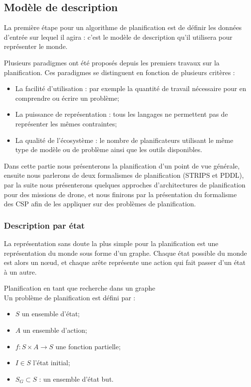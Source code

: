 \subsection{Modèle de description}

La première étape pour un algorithme de planification est de définir les données d'entrée sur lequel il agira : c'est le modèle de description qu'il utilisera pour représenter le monde.

Plusieurs paradigmes ont été proposés depuis les premiers travaux sur la planification. Ces paradigmes se distinguent en fonction de plusieurs critères :

\begin{itemize}
	\item La facilité d'utilisation : par exemple la quantité de travail nécessaire pour en comprendre ou écrire un problème;
	\item La puissance de représentation : tous les langages ne permettent pas de représenter les mêmes contraintes;
	\item La qualité de l'écosystème : le nombre de planificateurs utilisant le même type de modèle ou de problème ainsi que les outils disponibles.
\end{itemize}

Dans cette partie nous présenterons la planification d'un point de vue générale, ensuite nous parlerons de deux formalismes de planification (STRIPS et PDDL), par la suite nous présenterons quelques approches d'architectures de planification pour des missions de drone, et nous finirons par la présentation du formalisme des CSP afin de les appliquer sur des problèmes de planification. 

\subsubsection{Description par état}

La représentation sans doute la plus simple pour la planification est une représentation du monde sous forme d'un graphe. Chaque état possible du monde est alors un nœud, et chaque arête représente une action qui fait passer d'un état à un autre.

\begin{definition}Planification en tant que recherche dans un graphe\\
	\label{def:plannif_etat}Un problème de planification est défini par :
	\begin{itemize}
		\item $S$ un ensemble d'état;
		\item $A$ un ensemble d'action;
		\item $f : S \times A \to S$ une fonction partielle;
		\item $I \in S$ l'état initial;
		\item $S_G \subset S$ : un ensemble d'état but.
	\end{itemize}
\end{definition}

